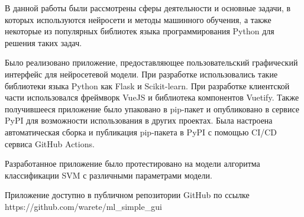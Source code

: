 \conclusion
В данной работы были рассмотрены сферы деятельности и основные задачи, в которых используются нейросети и методы машинного обучения, а также некоторые из популярных библиотек языка программирования Python для решения таких задач.


Было реализовано приложение, предоставляющее пользовательский графический интерфейс для нейросетевой модели. При разработке использовались такие библиотеки языка Python как Flask и Scikit-learn. При разработке клиентской части использовался фреймворк VueJS и библиотека компонентов Vuetify. Также получившееся приложение было упаковано в pip-пакет и опубликовано в сервисе PyPI для возможности использования в других проектах. Была настроена автоматическая сборка и публикация pip-пакета в PyPI с помощью CI/CD сервиса GitHub Actions.


Разработанное приложение было протестировано на модели алгоритма классификации SVM с различными параметрами модели. 

Приложение доступно в публичном репозитории GitHub по ссылке 
\\
https://github.com/warete/ml\_simple\_gui

